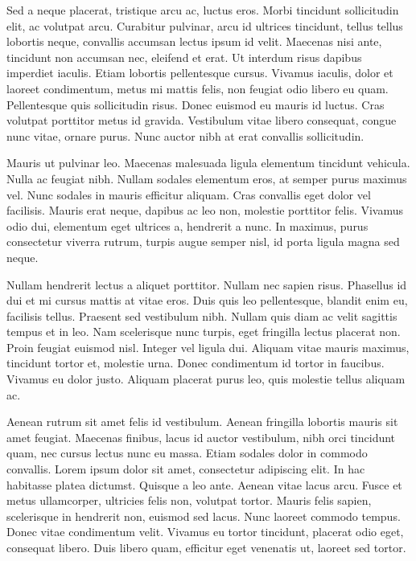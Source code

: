 Sed a neque placerat, tristique arcu ac, luctus eros. Morbi tincidunt
sollicitudin elit, ac volutpat arcu. Curabitur pulvinar, arcu id ultrices
tincidunt, tellus tellus lobortis neque, convallis accumsan lectus ipsum id
velit. Maecenas nisi ante, tincidunt non accumsan nec, eleifend et erat. Ut
interdum risus dapibus imperdiet iaculis. Etiam lobortis pellentesque cursus.
Vivamus iaculis, dolor et laoreet condimentum, metus mi mattis felis, non
feugiat odio libero eu quam. Pellentesque quis sollicitudin risus. Donec
euismod eu mauris id luctus. Cras volutpat porttitor metus id gravida.
Vestibulum vitae libero consequat, congue nunc vitae, ornare purus. Nunc auctor
nibh at erat convallis sollicitudin.

Mauris ut pulvinar leo. Maecenas malesuada ligula elementum tincidunt vehicula.
Nulla ac feugiat nibh. Nullam sodales elementum eros, at semper purus maximus
vel. Nunc sodales in mauris efficitur aliquam. Cras convallis eget dolor vel
facilisis. Mauris erat neque, dapibus ac leo non, molestie porttitor felis.
Vivamus odio dui, elementum eget ultrices a, hendrerit a nunc. In maximus,
purus consectetur viverra rutrum, turpis augue semper nisl, id porta ligula
magna sed neque.

Nullam hendrerit lectus a aliquet porttitor. Nullam nec sapien risus. Phasellus
id dui et mi cursus mattis at vitae eros. Duis quis leo pellentesque, blandit
enim eu, facilisis tellus. Praesent sed vestibulum nibh. Nullam quis diam ac
velit sagittis tempus et in leo. Nam scelerisque nunc turpis, eget fringilla
lectus placerat non. Proin feugiat euismod nisl. Integer vel ligula dui.
Aliquam vitae mauris maximus, tincidunt tortor et, molestie urna. Donec
condimentum id tortor in faucibus. Vivamus eu dolor justo. Aliquam placerat
purus leo, quis molestie tellus aliquam ac.

Aenean rutrum sit amet felis id vestibulum. Aenean fringilla lobortis mauris
sit amet feugiat. Maecenas finibus, lacus id auctor vestibulum, nibh orci
tincidunt quam, nec cursus lectus nunc eu massa. Etiam sodales dolor in commodo
convallis. Lorem ipsum dolor sit amet, consectetur adipiscing elit. In hac
habitasse platea dictumst. Quisque a leo ante. Aenean vitae lacus arcu. Fusce
et metus ullamcorper, ultricies felis non, volutpat tortor. Mauris felis
sapien, scelerisque in hendrerit non, euismod sed lacus. Nunc laoreet commodo
tempus. Donec vitae condimentum velit. Vivamus eu tortor tincidunt, placerat
odio eget, consequat libero. Duis libero quam, efficitur eget venenatis ut,
laoreet sed tortor.

